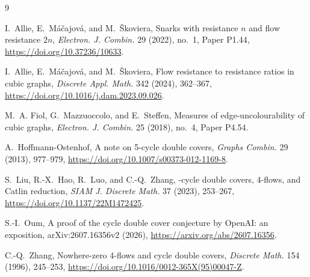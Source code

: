 \documentclass[11pt]{article}
\theoremstyle{definition}
\begin{document}
\begin{thebibliography}{9}

I.~Allie, E.~M\'a\v{c}ajov\'a, and M.~\v{S}koviera,
\newblock Snarks with resistance \(n\) and flow resistance \(2n\),
\newblock \emph{Electron. J. Combin.} 29 (2022), no.~1, Paper P1.44,
\newblock \url{https://doi.org/10.37236/10633}.

I.~Allie, E.~M\'a\v{c}ajov\'a, and M.~\v{S}koviera,
\newblock Flow resistance to resistance ratios in cubic graphs,
\newblock \emph{Discrete Appl. Math.} 342 (2024), 362--367,
\newblock \url{https://doi.org/10.1016/j.dam.2023.09.026}.

M.~A. Fiol, G.~Mazzuoccolo, and E.~Steffen,
\newblock Measures of edge-uncolourability of cubic graphs,
\newblock \emph{Electron. J. Combin.} 25 (2018), no.~4, Paper P4.54.

A.~Hoffmann-Ostenhof,
\newblock A note on 5-cycle double covers,
\newblock \emph{Graphs Combin.} 29 (2013), 977--979,
\newblock \url{https://doi.org/10.1007/s00373-012-1169-8}.

S.~Liu, R.-X.~Hao, R.~Luo, and C.-Q.~Zhang,
-cycle double covers, 4-flows, and Catlin reduction,
\newblock \emph{SIAM J. Discrete Math.} 37 (2023), 253--267,
\newblock \url{https://doi.org/10.1137/22M1472425}.

S.-I.~Oum,
\newblock A proof of the cycle double cover conjecture by OpenAI:
an exposition,
\newblock arXiv:2607.16356v2 (2026),
\newblock \url{https://arxiv.org/abs/2607.16356}.

C.-Q.~Zhang,
\newblock Nowhere-zero 4-flows and cycle double covers,
\newblock \emph{Discrete Math.} 154 (1996), 245--253,
\newblock \url{https://doi.org/10.1016/0012-365X(95)00047-Z}.

\end{thebibliography}
\end{document}
